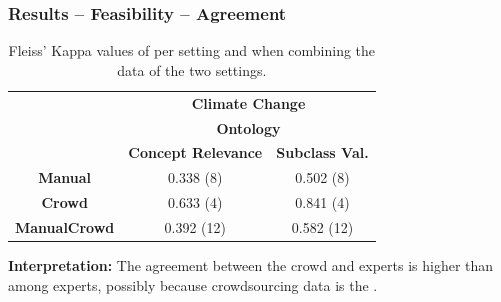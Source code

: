 \documentclass{beamer}
\begin{document}
\begin{frame}
  \frametitle{Results -- Feasibility -- Agreement}

        \begin{table}
        \small
        \center
        \begin{tabular}{|c|c|c|} \hline
            & \multicolumn{2}{|c|}{\textbf{Climate Change}} \\ 
                & \multicolumn{2}{|c|}{\textbf{Ontology}} \\ 

                  \cline{2-3}
                                              & \textbf{Concept Relevance} & \textbf{Subclass Val.} \\ \hline
        \textbf{Manual}                   & 0.338 (8)     & 0.502 (8)      \\ \hline
        \textbf{Crowd}                    & 0.633 (4)     & 0.841 (4)      \\ \hline
        \textbf{ManualCrowd}              & 0.392 (12)    & 0.582 (12)     \\ \hline
        \end{tabular}
        \caption{Fleiss' Kappa values of  per setting and when combining the data of the two settings.}
    \label{table:eval_qual}

\end{table}
\vspace{0.5cm}
\small \textbf{Interpretation:} The agreement between the crowd and experts is higher than among experts, possibly because crowdsourcing data is the .
\end{frame}
\end{document}
